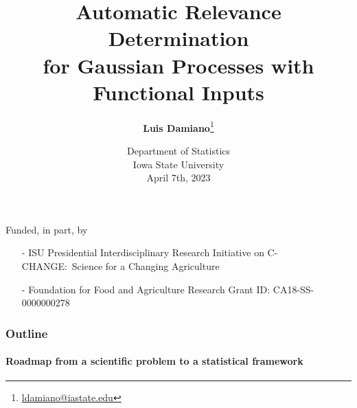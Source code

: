 \documentclass{snedecorbeamer}
\title{\textbf{Automatic Relevance Determination} \\
  for Gaussian Processes with Functional Inputs}
\author[Damiano et al]{
  \textbf{Luis Damiano}\footnote[2]{
    \tiny{\href{mailto:ldamiano@iastate.edu}{ldamiano@iastate.edu}}
  }}
\institute{
  Department of Statistics, Iowa State University
}
\date[April 7th, 2023]{
  \tiny{Department of Statistics \\
    Iowa State University} \\
  April 7th, 2023}
\begin{document}
\begin{frame}
  \titlepage{}
  {
    \tiny{
      Funded, in part, by
      \begin{itemize}
      \item[-] ISU Presidential Interdisciplinary
	Research Initiative on C-CHANGE:~Science for a Changing
	Agriculture
      \item[-] Foundation for Food and Agriculture Research
	Grant ID: CA18-SS-0000000278
      \end{itemize}
    }
  }
\end{frame}

\begin{frame}
  \frametitle{Outline}
  \framesubtitle{Roadmap from a scientific problem to a statistical framework}

  \begingroup
  \endgroup





\end{frame}
\end{document}
